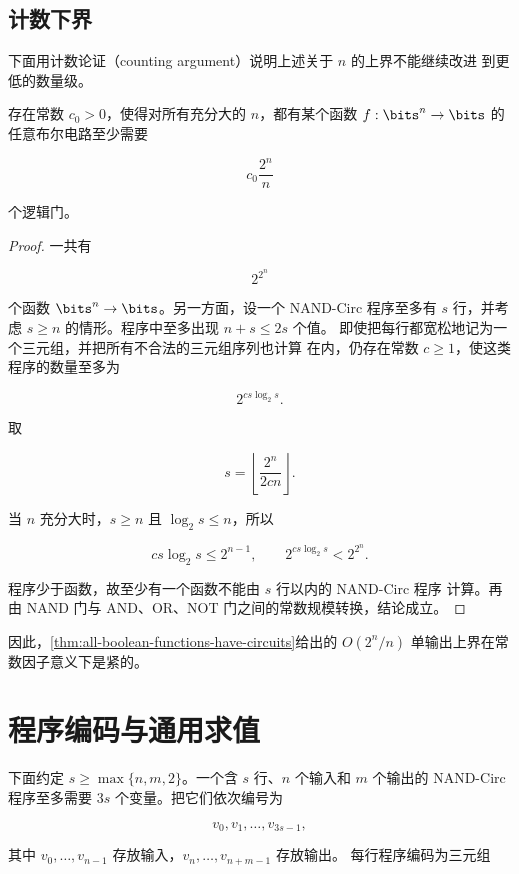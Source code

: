 \subsection{计数下界}

下面用计数论证（counting argument）说明上述关于 $n$ 的上界不能继续改进
到更低的数量级。

\begin{proposition}[布尔函数的电路下界]
  \label{prop:boolean-circuit-counting-lower-bound}
  存在常数 $c_0>0$，使得对所有充分大的 $n$，都有某个函数
  $f:\bits^n\to\bits$ 的任意布尔电路至少需要

  \[
    c_0\frac{2^n}{n}
  \]

  个逻辑门。
\end{proposition}

\begin{proof}
  一共有

  \[
    2^{2^n}
  \]

  个函数 $\bits^n\to\bits$。另一方面，设一个 NAND-Circ 程序至多有
  $s$ 行，并考虑 $s\geq n$ 的情形。程序中至多出现 $n+s\leq 2s$ 个值。
  即使把每行都宽松地记为一个三元组，并把所有不合法的三元组序列也计算
  在内，仍存在常数 $c\geq 1$，使这类程序的数量至多为

  \[
    2^{cs\log_2 s}.
  \]

  取

  \[
    s=\left\lfloor\frac{2^n}{2cn}\right\rfloor.
  \]

  当 $n$ 充分大时，$s\geq n$ 且 $\log_2s\leq n$，所以

  \[
    cs\log_2s\leq 2^{n-1},
    \qquad
    2^{cs\log_2s}<2^{2^n}.
  \]

  程序少于函数，故至少有一个函数不能由 $s$ 行以内的 NAND-Circ 程序
  计算。再由 NAND 门与 AND、OR、NOT 门之间的常数规模转换，结论成立。
\end{proof}

因此，\cref{thm:all-boolean-functions-have-circuits}给出的
$O(2^n/n)$ 单输出上界在常数因子意义下是紧的。

\section{程序编码与通用求值}

下面约定 $s\geq\max\{n,m,2\}$。一个含 $s$ 行、$n$ 个输入和 $m$ 个输出的
NAND-Circ 程序至多需要 $3s$ 个变量。把它们依次编号为

\[
  v_0,v_1,\ldots,v_{3s-1},
\]

其中 $v_0,\ldots,v_{n-1}$ 存放输入，$v_n,\ldots,v_{n+m-1}$ 存放输出。
每行程序编码为三元组

